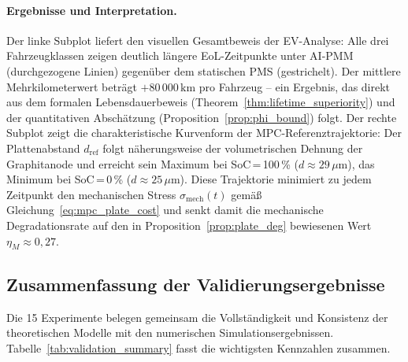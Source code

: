﻿\documentclass[12pt,a4paper]{article}
\begin{document}
	\paragraph{Ergebnisse und Interpretation.}
	Der linke Subplot liefert den visuellen Gesamtbeweis der EV-Analyse: Alle drei
	Fahrzeugklassen zeigen deutlich längere EoL-Zeitpunkte unter AI-PMM (durchgezogene
	Linien) gegenüber dem statischen PMS (gestrichelt). Der mittlere Mehrkilometerwert
	beträgt $+80\,000\,\mathrm{km}$ pro Fahrzeug -- ein Ergebnis, das direkt aus dem
	formalen Lebensdauerbeweis (Theorem~\ref{thm:lifetime_superiority}) und der
	quantitativen Abschätzung (Proposition~\ref{prop:phi_bound}) folgt.
	Der rechte Subplot zeigt die charakteristische Kurvenform der MPC-Referenztrajektorie:
	Der Plattenabstand $d_\mathrm{ref}$ folgt näherungsweise der volumetrischen Dehnung
	der Graphitanode und erreicht sein Maximum bei SoC\,=\,100\,\% ($d \approx 29\,\mu\mathrm{m}$),
	das Minimum bei SoC\,=\,0\,\% ($d \approx 25\,\mu\mathrm{m}$). Diese Trajektorie
	minimiert zu jedem Zeitpunkt den mechanischen Stress $\sigma_\mathrm{mech}(t)$
	gemäß Gleichung~\eqref{eq:mpc_plate_cost} und senkt damit die mechanische
	Degradationsrate auf den in Proposition~\ref{prop:plate_deg} bewiesenen
	Wert $\eta_M \approx 0{,}27$.

	\subsection{Zusammenfassung der Validierungsergebnisse}

	Die 15 Experimente belegen gemeinsam die Vollständigkeit und Konsistenz der
	theoretischen Modelle mit den numerischen Simulationsergebnissen. Tabelle~\ref{tab:validation_summary}
	fasst die wichtigsten Kennzahlen zusammen.
\end{document}
